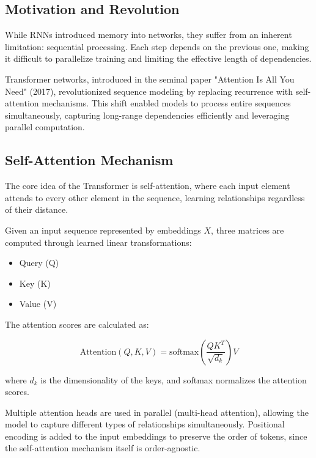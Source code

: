 \documentclass[openany]{book}
\begin{document}
\subsection{Motivation and Revolution}

While RNNs introduced memory into networks, they suffer from an inherent 
limitation: sequential processing. Each step depends on the previous one, making
it difficult to parallelize training and limiting the effective length of 
dependencies.

Transformer networks, introduced in the seminal paper 
"Attention Is All You Need" (2017), revolutionized sequence modeling by 
replacing recurrence with self-attention mechanisms. This shift enabled models 
to process entire sequences simultaneously, capturing long-range dependencies 
efficiently and leveraging parallel computation.

\subsection{Self-Attention Mechanism}

The core idea of the Transformer is self-attention, where each input element 
attends to every other element in the sequence, learning relationships 
regardless of their distance.

Given an input sequence represented by embeddings $X$, three matrices are 
computed through learned linear transformations:

\begin{itemize}
    \item Query (Q)
    \item Key (K)
    \item Value (V)
\end{itemize}

The attention scores are calculated as:

\begin{equation}
\text{Attention}(Q, K, V) = \text{softmax}\left(\frac{QK^T}{\sqrt{d_k}}\right)V
\end{equation}

where $d_k$ is the dimensionality of the keys, and softmax normalizes the 
attention scores.

Multiple attention heads are used in parallel (multi-head attention), 
allowing the model to capture different types of relationships simultaneously. 
Positional encoding is added to the input embeddings to preserve the order of 
tokens, since the self-attention mechanism itself is order-agnostic.
\end{document}
